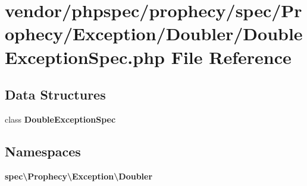 \section{vendor/phpspec/prophecy/spec/\+Prophecy/\+Exception/\+Doubler/\+Double\+Exception\+Spec.php File Reference}
\label{_double_exception_spec_8php}
\subsection*{Data Structures}
\begin{DoxyCompactItemize}
\item 
class {\bf Double\+Exception\+Spec}
\end{DoxyCompactItemize}
\subsection*{Namespaces}
\begin{DoxyCompactItemize}
\item 
 {\bf spec\textbackslash{}\+Prophecy\textbackslash{}\+Exception\textbackslash{}\+Doubler}
\end{DoxyCompactItemize}

